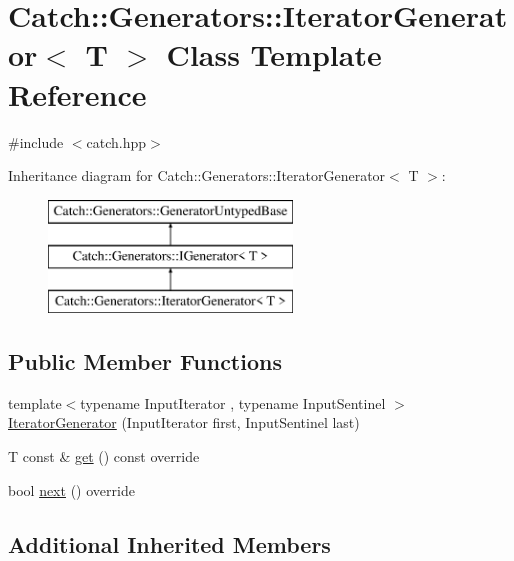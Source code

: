 \hypertarget{class_catch_1_1_generators_1_1_iterator_generator}{}\section{Catch\+:\+:Generators\+:\+:Iterator\+Generator$<$ T $>$ Class Template Reference}
\label{class_catch_1_1_generators_1_1_iterator_generator}


{\ttfamily \#include $<$catch.\+hpp$>$}

Inheritance diagram for Catch\+:\+:Generators\+:\+:Iterator\+Generator$<$ T $>$\+:\begin{figure}[H]
\begin{center}
\leavevmode
\includegraphics[height=3.000000cm]{class_catch_1_1_generators_1_1_iterator_generator}
\end{center}
\end{figure}
\subsection*{Public Member Functions}
\begin{DoxyCompactItemize}
\item 
{\footnotesize template$<$typename Input\+Iterator , typename Input\+Sentinel $>$ }\\\mbox{\hyperlink{class_catch_1_1_generators_1_1_iterator_generator_a1f795b1bbd515274673115c0a9fc2e54}{Iterator\+Generator}} (Input\+Iterator first, Input\+Sentinel last)
\item 
T const  \& \mbox{\hyperlink{class_catch_1_1_generators_1_1_iterator_generator_a61688118e5caba23340b4b949c3bb7e4}{get}} () const override
\item 
bool \mbox{\hyperlink{class_catch_1_1_generators_1_1_iterator_generator_acafb4fa1eebe5e1db571621a35a3f137}{next}} () override
\end{DoxyCompactItemize}
\subsection*{Additional Inherited Members}


